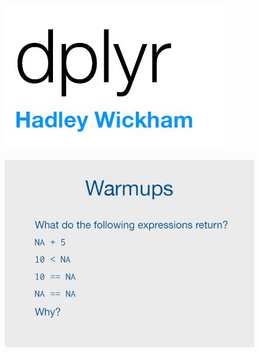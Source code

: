 \documentclass{beamer}
\begin{document}
	
\begin{frame}
	\begin{figure}
		\centering
		\includegraphics[width=0.78\linewidth]{images/dplyr-title}
	\end{figure}
\end{frame}
\begin{frame}
\begin{figure}
\centering
\includegraphics[width=1.05\linewidth]{images/CG-dplyr1}
\end{figure}
\end{frame}
\end{document}
